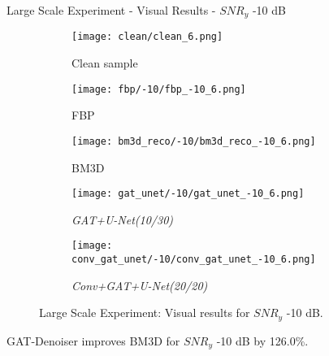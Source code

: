 \begin{frame}{Large Scale Experiment - Visual Results - $SNR_y$ -10 dB}
    \begin{figure}
        \captionsetup[subfigure]{justification=centering}
        \centering
        \begin{subfigure}[t]{0.18\textwidth}
          \texttt{[image: clean/clean\_6.png]}
          \caption{Clean sample}
        \end{subfigure} \hfill
        \begin{subfigure}[t]{0.18\textwidth}
          \texttt{[image: fbp/-10/fbp\_-10\_6.png]}
          \caption{FBP}
        \end{subfigure} \hfill
        \begin{subfigure}[t]{0.18\textwidth}
          \texttt{[image: bm3d\_reco/-10/bm3d\_reco\_-10\_6.png]}
          \caption{BM3D}
        \end{subfigure} \hfill
        \begin{subfigure}[t]{0.18\textwidth}
          \texttt{[image: gat\_unet/-10/gat\_unet\_-10\_6.png]}
          \caption{\textit{GAT+U-Net(10/30)}}
        \end{subfigure} \hfill
        \begin{subfigure}[t]{0.18\textwidth}
          \texttt{[image: conv\_gat\_unet/-10/conv\_gat\_unet\_-10\_6.png]}
          \caption{\textit{Conv+GAT+U-Net(20/20)}}
        \end{subfigure} \hfill
        \caption{Large Scale Experiment: Visual results for $SNR_y$ -10 dB.}
      \end{figure}
      
    
      \begin{tcolorbox}[colback=red!5!white,hide=<1>, alert=<2>, colframe=red!75!black]
        GAT-Denoiser improves BM3D for $SNR_y$ -10 dB by 126.0\%.
        \end{tcolorbox}
        
\end{frame}

